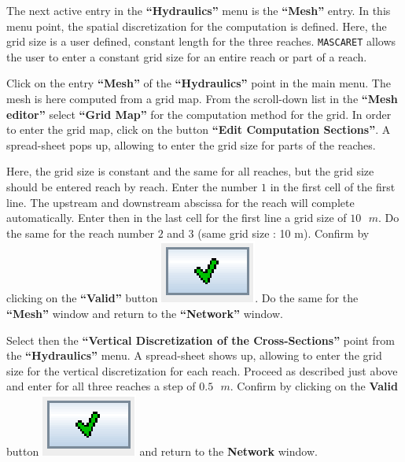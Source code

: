 \documentclass[a4paper,12pt]{article}
\begin{document}
\hspace{0.5cm}The next active entry in the \textbf{{}``Hydraulics''} menu is the
\textbf{{}``Mesh''} entry. In this menu point, the spatial discretization
for the computation is defined. Here, the grid size is a user defined,
constant length for the three reaches. \texttt{MASCARET} allows the user
to enter a constant grid size for an entire reach or part of a reach.

\vspace{0.5cm}

Click on the entry \textbf{{}``Mesh''} of the \textbf{{}``Hydraulics''}
point in the main menu. The mesh is here computed from a grid map.
From the scroll-down list in the \textbf{{}``Mesh editor''} select
\textbf{{}``Grid Map''} for the computation method for the grid.
In order to enter the grid map, click on the button \textbf{{}``Edit
Computation Sections''}. A spread-sheet pops up, allowing to
enter the grid size for parts of the reaches.

\vspace{0.5cm}

Here, the grid size is constant and the same for all reaches, but
the grid size should be entered reach by reach. Enter the number $1$
in the first cell of the first line. The upstream and downstream abscissa
for the reach will complete automatically. Enter then in the last
cell for the first line a grid size of $10\mbox{ }m$. Do the same for the reach
number $2$ and $3$ (same grid size : 10 m). Confirm by clicking on the
\textbf{{}``Valid'' }button \includegraphics[scale=0.6]{valid}.
Do the same for the \textbf{{}``Mesh''} window and return to the
\textbf{{}``Network'' }window.

\vspace{0.5cm}

Select then the \textbf{{}``Vertical Discretization of the Cross-Sections''}
point from the \textbf{{}``Hydraulics''} menu. A spread-sheet shows
up, allowing to enter the grid size for the vertical discretization
for each reach. Proceed as described just above and enter for all
three reaches a step of $0.5\mbox{ }m$. Confirm by clicking on the \textbf{Valid
}button \includegraphics[scale=0.6]{valid}
and return to the \textbf{Network} window.
\end{document}
